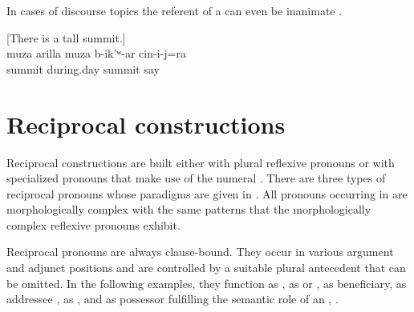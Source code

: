 In cases of discourse topics the referent of a  can even be inanimate .

\begin{exe}
	\ex	\label{ex:‎[‎‎There is a tall summit.] It is called the midday summit} ‎[‎‎There is a tall summit.] \\
	\gll	muza	arilla	muza	b-ik'ʷ-ar	cin-i-j=ra\\
		summit	during.day	summit	say	\\
	\glt	{}
\end{exe}



\section{Reciprocal constructions}
\label{sec:Reciprocal constructionss}

Reciprocal constructions are built either with plural reflexive pronouns  or with specialized pronouns that make use of the numeral  . There are three types of reciprocal pronouns whose paradigms are given in . All pronouns occurring in  are morphologically complex with the same patterns that the morphologically complex reflexive pronouns exhibit.

Reciprocal pronouns are always clause-bound. They occur in various argument and adjunct positions and are controlled by a suitable plural antecedent that can be omitted. In the following examples, they function as  , as  or  , as beneficiary, as addressee , as  , and as  possessor fulfilling the semantic role of an  , . 


